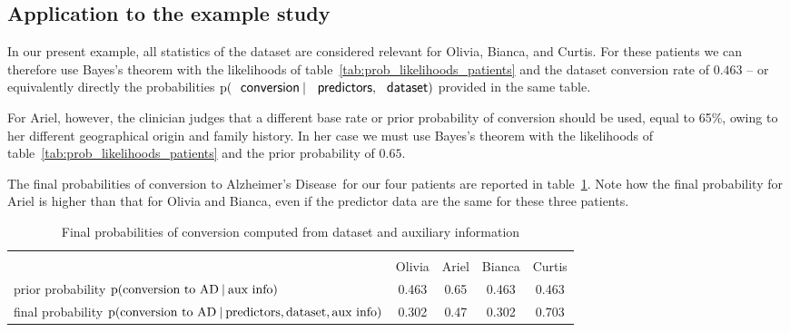 \documentclass[utf8]{FrontiersinHarvard} %
\newcommand*{\p}{\mathrm{p}}%
\renewcommand*{\|}[1][]{\nonscript\:#1\vert\nonscript\:\mathopen{}}
\newcommand*{\ad}{Alzheimer's Disease}
\newcommand*{\mci}{Mild Cognitive Impairment}
\begin{document}


\subsection{Application to the example study}
\label{sec:posterior_application}

In our present example, all statistics of the dataset are considered relevant for Olivia, Bianca, and Curtis. For these patients we can therefore use Bayes's theorem with the likelihoods of table~\ref{tab:prob_likelihoods_patients} and the dataset conversion rate of $0.463$ -- or equivalently directly the probabilities $\p(\textsf{\small conversion} \| \textsf{\small predictors}, \textsf{\small dataset})$ provided in the same table.

For Ariel, however, the clinician judges that a different base rate or prior probability of conversion should be used, equal to 65\%,  owing to her different geographical origin and family history. In her case we must use Bayes's theorem with the likelihoods of table~\ref{tab:prob_likelihoods_patients} and the prior probability of $0.65$.

The final probabilities of conversion to \ad\ for our four patients are reported in table~\ref{tab:posterior_patients}. Note how the final probability for Ariel is higher than that for Olivia and Bianca, even if the predictor data are the same for these three patients.

\medskip
\begin{table}[!h]
  \centering
  \begin{tabular}{lcccc}
    \hline\\[-1.5\jot]
    &{\small Olivia} &{\small Ariel} &{\small Bianca} &{\small Curtis}
    \\[\jot]
    {\small prior probability $\p(\text{conversion to AD} \| \text{aux info})$}&
    0.463&0.65&0.463&0.463
    \\
    {\small final probability $\p(\text{conversion to AD} \| \text{predictors}, \text{dataset}, \text{aux info})$}&
    0.302&0.47&0.302&0.703
    \\[\jot]
    \hline
  \end{tabular}
    \caption{Final probabilities of conversion computed from dataset and auxiliary information}\label{tab:posterior_patients}
\end{table}
\end{document}

